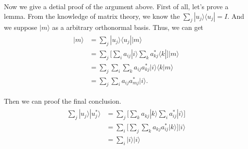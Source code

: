 \documentclass[twocolumn,notitlepage]{revtex4-1}
\def\ket#1{| #1 \rangle}
\def\bra#1{\langle #1 |}
\def\ip#1#2{\langle #1 | #2 \rangle}
\begin{document}
Now we give a detial proof of the argument above. First of all, let's prove a lemma. From the knowledge of matrix theory, we know the $\sum_{j}\ket{u_{j}}\bra{u_{j}} = I$. And we suppose $\ket{m}$ as a arbitrary orthonormal basis.
Thus, we can get 
\begin{align}
    \begin{split}
        \ket{m}  &= \sum_{j}\ket{u_{j}}\bra{u_{j}}\ket{m}       \\
        &=\sum_{j}\bigg[\sum_{i}a_{ij}\ket{i}\sum_{k}a_{kj}^*\bra{k}\bigg]\ket{m}  \\
        &= \sum_{j}\sum_{i}\sum_{k} a_{ij} a_{kj}^*\ket{i}\ip{k}{m}  \\
        &= \sum_{j}\sum_{i}a_{ij} a_{mj}^*\ket{i}.
    \end{split}
\end{align}

Then we can proof the final conclusion.
\begin{align}
    \begin{split}
        \sum_{j}\ket{u_{j}}|u_{j}^*\rangle &= \sum_{j}\bigg[ \sum_{k}a_{kj}|k\rangle \sum_{i}a_{ij}^*\ket{i}\bigg]\\
        &=  \sum_{i}\bigg[\sum_{j}\sum_{k}a_{kj}a_{ij}^*|k\rangle\bigg]\ket{i}\\
        &= \sum_{i}\ket{i}\ket{i}
    \end{split}
\end{align}
\end{document}
